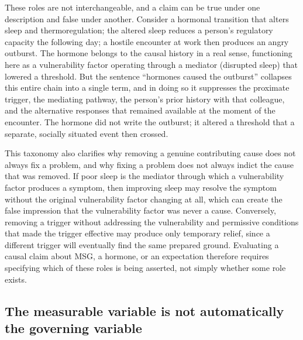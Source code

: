 \documentclass[11pt]{article}
\begin{document}
These roles are not interchangeable, and a claim can be true under one description and false under another. Consider a hormonal transition that alters sleep and thermoregulation; the altered sleep reduces a person's regulatory capacity the following day; a hostile encounter at work then produces an angry outburst. The hormone belongs to the causal history in a real sense, functioning here as a vulnerability factor operating through a mediator (disrupted sleep) that lowered a threshold. But the sentence ``hormones caused the outburst'' collapses this entire chain into a single term, and in doing so it suppresses the proximate trigger, the mediating pathway, the person's prior history with that colleague, and the alternative responses that remained available at the moment of the encounter. The hormone did not write the outburst; it altered a threshold that a separate, socially situated event then crossed.

This taxonomy also clarifies why removing a genuine contributing cause does not always fix a problem, and why fixing a problem does not always indict the cause that was removed. If poor sleep is the mediator through which a vulnerability factor produces a symptom, then improving sleep may resolve the symptom without the original vulnerability factor changing at all, which can create the false impression that the vulnerability factor was never a cause. Conversely, removing a trigger without addressing the vulnerability and permissive conditions that made the trigger effective may produce only temporary relief, since a different trigger will eventually find the same prepared ground. Evaluating a causal claim about MSG, a hormone, or an expectation therefore requires specifying which of these roles is being asserted, not simply whether some role exists.

\subsection{The measurable variable is not automatically the governing variable}
\end{document}
